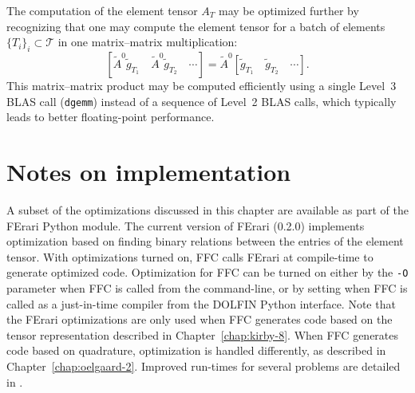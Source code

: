 The computation of the element tensor $A_T$ may be optimized further
by recognizing that one may compute the element tensor for a batch of
elements $\{T_i\}_i \subset \mathcal{T}$ in one matrix--matrix
multiplication:
\begin{equation}
  \left[\tilde{A}^0 \tilde{g}_{T_1} \quad \tilde{A}^0 \tilde{g}_{T_2} \quad \cdots \right] =
  \tilde{A}^0 \left[\tilde{g}_{T_1} \quad \tilde{g}_{T_2} \quad \cdots\right].
\end{equation}
This matrix--matrix product may be computed efficiently using a single
Level~3 BLAS call (\texttt{dgemm}) instead of a sequence of Level~2
BLAS calls, which typically leads to better floating-point
performance.

\section{Notes on implementation}

A subset of the optimizations discussed in this chapter are available
as part of the FErari Python module. The current version of FErari
(0.2.0) implements optimization based on finding binary relations
between the entries of the element tensor. With optimizations turned
on, FFC calls FErari at compile-time to generate optimized
code. Optimization for FFC can be turned on either by the \texttt{-O}
parameter when FFC is called from the command-line, or by setting
 when FFC is
called as a just-in-time compiler from the DOLFIN Python
interface. Note that the FErari optimizations are only used when FFC
generates code based on the tensor representation described in
Chapter~\ref{chap:kirby-8}. When FFC generates code based on
quadrature, optimization is handled differently, as described in
Chapter~\ref{chap:oelgaard-2}.  Improved run-times for several
problems are detailed in \citet{KirbyLogg2008}.
